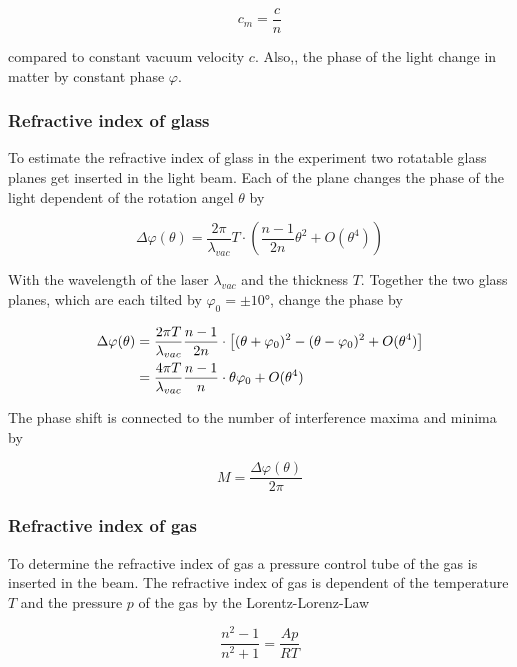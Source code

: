 \begin{equation}
	c_m=\frac{c}{n}
\end{equation}

compared to constant vacuum velocity $c$. Also,, the phase of the light change
in matter by constant phase $\varphi $.

\subsubsection{Refractive index of glass}
To estimate the refractive index of glass in the experiment two rotatable glass
planes get inserted in the light beam. Each of the plane changes the phase of
the light dependent of the rotation angel $\theta $ by

\begin{equation}
	\Delta \varphi(\theta ) =\frac{2\pi }{\lambda_{vac}}T \cdot \left(\frac{n-1}{2n}\theta ^2 +O(\theta ^4)  \right)
\end{equation}

With the wavelength of the laser $\lambda_{vac}$ and the thickness $T$.
Together the two glass planes, which are each tilted by $\varphi_0=\pm 10°$,
change the phase by

\begin{align}
	\Delta \varphi(\theta ) & =\frac{2\pi T}{\lambda_{vac}} \frac{n-1}{2n} \cdot \left[(\theta+\varphi_0)^2 - (\theta-\varphi_0)^2 +O(\theta ^4)  \right] \notag \\
	                        & =\frac{4\pi T}{\lambda_{vac}} \frac{n-1}{n} \cdot \theta\varphi_0 +O(\theta ^4) \label{eq:glass}
\end{align}

The phase shift is connected to the number of interference maxima and minima by

\begin{equation}
	M=\frac{\Delta \varphi(\theta)}{2\pi}
\end{equation}

\subsubsection{Refractive index of gas}
To determine the refractive index of gas a pressure control tube of the gas is
inserted in the beam. The refractive index of gas is dependent of the
temperature $T$ and the pressure $p$ of the gas by the Lorentz-Lorenz-Law

\begin{equation}
	\frac{n^2-1}{n^2+1}=\frac{Ap}{RT}
\end{equation}

